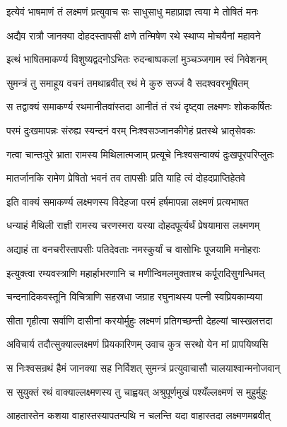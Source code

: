 \twolineshloka
{इत्येवं भाषमाणं तं लक्ष्मणं प्रत्युवाच सः}
{साधुसाधु महाप्राज्ञ त्वया मे तोषितं मनः}%

\twolineshloka
{अद्यैव रात्रौ जानक्या दोहदस्तापसी क्षणे}
{तन्मिषेण रथे स्थाप्य मोचयैनां महावने}%

\twolineshloka
{इत्थं भाषितमाकर्ण्य विशुष्यद्वदनोऽभितः}
{रुदन्बाष्पकलां मुञ्चञ्जगाम स्वं निवेशनम्}%

\twolineshloka
{सुमन्त्रं तु समाहूय वचनं तमथाब्रवीत्}
{रथं मे कुरु सज्जं वै सदश्ववरभूषितम्}%

\twolineshloka
{स तद्वाक्यं समाकर्ण्य रथमानीतवांस्तदा}
{आनीतं तं रथं दृष्ट्वा लक्ष्मणः शोककर्षितः}%

\twolineshloka
{परमं दुःखमापन्नः संरुह्य स्यन्दनं वरम्}
{निःश्वसञ्जानकीगेहं प्रतस्थे भ्रातृसेवकः}%

\twolineshloka
{गत्वा चान्तःपुरे भ्राता रामस्य मिथिलात्मजाम्}
{प्रत्यूचे निःश्वसन्वाक्यं दुःखपूरपरिप्लुतः}%

\twolineshloka
{मातर्जानकि रामेण प्रेषितो भवनं तव}
{तापसीः प्रति याहि त्वं दोहदप्राप्तिहेतवे}%

\twolineshloka
{इति वाक्यं समाकर्ण्य लक्ष्मणस्य विदेहजा}
{परमं हर्षमापन्ना लक्ष्मणं प्रत्यभाषत}%


\twolineshloka
{धन्याहं मैथिली राज्ञी रामस्य चरणस्मरा}
{यस्या दोहदपूर्त्यर्थं प्रेषयामास लक्ष्मणम्}%

\twolineshloka
{अद्याहं ता वनचरीस्तापसीः पतिदेवताः}
{नमस्कुर्यां च वासोभिः पूजयामि मनोहराः}%

\twolineshloka
{इत्युक्त्वा रम्यवस्त्राणि महार्हाभरणानि च}
{मणीन्विमलमुक्ताश्च कर्पूरादिसुगन्धिमत्}%

\twolineshloka
{चन्दनादिकवस्तूनि विचित्राणि सहस्रधा}
{जग्राह रघुनाथस्य पत्नी स्वप्रियकाम्यया}%

\twolineshloka
{सीता गृहीत्वा सर्वाणि दासीनां करयोर्मुहुः}
{लक्ष्मणं प्रतिगच्छन्ती देहल्यां चास्खलत्तदा}%

\twolineshloka
{अविचार्य तदौत्सुक्याल्लक्ष्मणं प्रियकारिणम्}
{उवाच कुत्र सरथो येन मां प्रापयिष्यसि}%

\twolineshloka
{स निःश्वसन्रथं हैमं जानक्या सह निर्विशत्}
{सुमन्त्रं प्रत्युवाचासौ चालयाश्वान्मनोजवान्}%

\twolineshloka
{स सुयुक्तं रथं वाक्याल्लक्ष्मणस्य तु चाह्वयत्}
{अश्रुपूर्णमुखं पश्यँल्लक्ष्मणं स मुहुर्मुहुः}%

\twolineshloka
{आहतास्तेन कशया वाहास्तस्यापतन्पथि}
{न चलन्ति यदा वाहास्तदा लक्ष्मणमब्रवीत्}%

